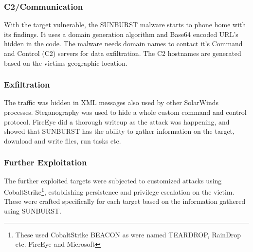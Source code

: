 \documentclass[
	letterpaper, %
	10pt, %
	unnumberedsections, %
	twoside, %
]{LTJournalArticle}
\begin{document}
\subsubsection{C2/Communication}
With the target vulnerable, the SUNBURST malware starts to phone home with its findings. It uses a domain generation algorithm \cite{Mandiant} and Base64 encoded URL's hidden in the code. The malware needs domain names to contact it's Command and Control (C2) servers for data exfiltration. The C2 hostnames are generated based on the victims geographic location. 

\subsubsection{Exfiltration}
The traffic was hidden in XML messages also used by other SolarWinds processes. Steganography was used to hide a whole custom command and control protocol. FireEye did a thorough writeup as the attack was happening\cite{Mandiant}, and showed that SUNBURST has the ability to gather information on the target, download and write files, run tasks etc.    

\subsubsection{Further Exploitation}
The further exploited targets were subjected to customized attacks using CobaltStrike\footnote{These used CobaltStrike BEACON as were named TEARDROP, RainDrop etc. FireEye and Microsoft\cite{MicrosoftSolarwinds}}, establishing persistence and privilege escalation on the victim. These were crafted specifically for each target based on the information gathered using SUNBURST.     
\end{document}
